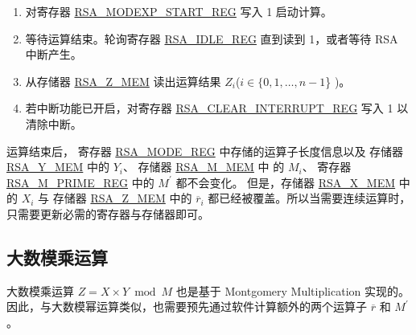 \documentclass[main\_\_CN.tex]{subfiles}
\begin{document}
\begin{enumerate}
    \item 对寄存器 \hyperref[regdesc:RSAMODEXPSTARTREG]{RSA\_MODEXP\_START\_REG} 写入 1 启动计算。

    \item 等待运算结束。轮询寄存器 \hyperref[regdesc:RSAIDLEREG]{RSA\_IDLE\_REG} 直到读到 1，或者等待 RSA 中断产生。

    \item 从存储器 \hyperref[regdesc:RSAmemory]{RSA\_Z\_MEM} 读出运算结果 \begin{math}Z_{i}\end{math}(\begin{math}i \in \{ 0, 1, \dots, n-1 \end{math}\} )。

    \item 若中断功能已开启，对寄存器 \hyperref[regdesc:RSACLEARINTERRUPTREG]{RSA\_CLEAR\_INTERRUPT\_REG} 写入 1 以清除中断。

\end{enumerate}

运算结束后，
寄存器 \hyperref[regdesc:RSAMODEXPMODEREG]{RSA\_MODE\_REG} 中存储的运算子长度信息以及
存储器 \hyperref[regdesc:RSAmemory]{RSA\_Y\_MEM} 中的 \begin{math}Y_{i}\end{math}、
存储器 \hyperref[regdesc:RSAmemory]{RSA\_M\_MEM} 中 的 \begin{math}M_{i}\end{math}、
寄存器 \hyperref[regdesc:RSAMPRIMEREG]{RSA\_M\_PRIME\_REG} 中的 \begin{math}M^{\prime}\end{math} 都不会变化。
但是，存储器 \hyperref[regdesc:RSAmemory]{RSA\_X\_MEM} 中的 \begin{math}X_{i}\end{math} 与
存储器 \hyperref[regdesc:RSAmemory]{RSA\_Z\_MEM} 中的 \begin{math}\overline{r}_{i}\end{math}
都已经被覆盖。所以当需要连续运算时，只需要更新必需的寄存器与存储器即可。


\subsection{大数模乘运算}

大数模乘运算 \begin{math}Z = X \times Y \bmod M\end{math} 也是基于 Montgomery Multiplication 实现的。因此，与大数模幂运算类似，也需要预先通过软件计算额外的两个运算子
\begin{math}\overline{r}\end{math} 和
\begin{math}M^{\prime}\end{math}。
\end{document}
